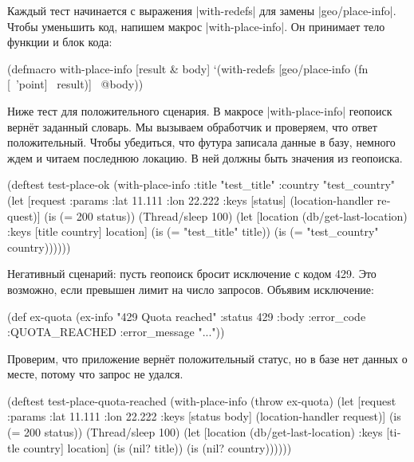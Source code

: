 Каждый тест начинается с выражения \spverb|with-redefs| для замены
\spverb|geo/place-info|. Чтобы уменьшить код, напишем макрос
\spverb|with-place-info|. Он принимает тело функции и блок кода:

\begin{english}
  \begin{clojure}
(defmacro with-place-info
  [result & body]
  `(with-redefs [geo/place-info
                 (fn [~'point] ~result)]
     ~@body))
  \end{clojure}
\end{english}

Ниже тест для положительного сценария. В макросе \spverb|with-place-info|
геопоиск верн\"{е}т заданный словарь. Мы вызываем обработчик и проверяем, что ответ
положительный. Чтобы убедиться, что футура записала данные в базу, немного ждем
и читаем последнюю локацию. В ней должны быть значения из геопоиска.

\begin{english}
  \begin{clojure}
(deftest test-place-ok
  (with-place-info
    {:title "test_title"
     :country "test_country"}
    (let [request {:params {:lat 11.111 :lon 22.222}}
          {:keys [status]} (location-handler request)]
      (is (= 200 status))
      (Thread/sleep 100)
      (let [location (db/get-last-location)
            {:keys [title country]} location]
        (is (= "test_title" title))
        (is (= "test_country" country))))))
  \end{clojure}
\end{english}


Негативный сценарий: пусть геопоиск бросит исключение с кодом 429. Это
возможно, если превышен лимит на число запросов. Объявим исключение:

\begin{english}
  \begin{clojure}
(def ex-quota
  (ex-info "429 Quota reached"
           {:status 429
            :body {:error_code :QUOTA_REACHED
                   :error_message "..."}}))
  \end{clojure}
\end{english}

\noindent
Проверим, что приложение верн\"{е}т положительный статус, но в базе нет данных о
месте, потому что запрос не удался.

\begin{english}
  \begin{clojure}
(deftest test-place-quota-reached
  (with-place-info (throw ex-quota)
    (let [request {:params {:lat 11.111 :lon 22.222}}
          {:keys [status body]} (location-handler request)]
      (is (= 200 status))
      (Thread/sleep 100)
      (let [location (db/get-last-location)
            {:keys [title country]} location]
        (is (nil? title))
        (is (nil? country))))))
  \end{clojure}
\end{english}


